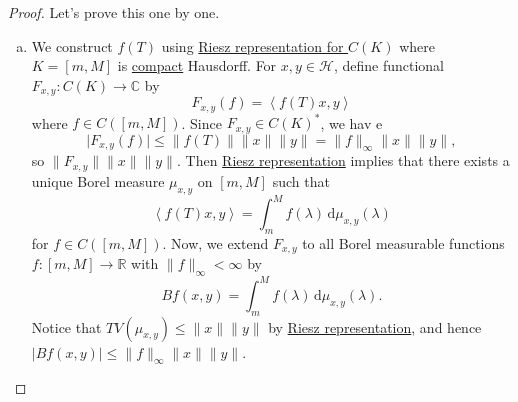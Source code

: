 \begin{proof}
	Let's prove this one by one.
	\begin{enumerate}[(a)]
		\item We construct \(f(T)\)  using \hyperref[thm:Riesz-representation-for-C-K]{Riesz representation for \(C(K)\)} where \(K = [m, M]\) is \hyperref[def:compact]{compact} Hausdorff. For \(x, y\in \mathcal{H} \), define functional \(F_{x, y} \colon C(K) \to \mathbb{C} \) by
		      \[
			      F_{x, y} (f) = \left\langle f(T)x, y \right\rangle
		      \]
		      where \(f\in C([m, M])\). Since \(F_{x, y} \in C(K)^{\ast} \), we hav e
		      \[
			      \vert F_{x, y}(f) \vert
			      \leq \lVert f(T) \rVert  \lVert x \rVert \lVert y \rVert
			      = \lVert f \rVert _{\infty } \lVert x \rVert \lVert y \rVert,
		      \]
		      so \(\lVert F_{x, y} \rVert \lVert x \rVert \lVert y \rVert \). Then \hyperref[thm:Riesz-representation-for-C-K]{Riesz representation} implies that there exists a unique Borel measure \(\mu _{x, y} \) on \([m, M]\) such that
		      \[
			      \left\langle f(T) x, y  \right\rangle
			      = \int_{m}^{M} f(\lambda ) \,\mathrm{d}\mu _{x, y}(\lambda )
		      \]
		      for \(f\in C([m, M])\). Now, we extend \(F_{x, y}\) to all Borel measurable functions \(f\colon [m, M] \to \mathbb{R} \) with \(\lVert f \rVert _\infty < \infty \) by
		      \[
			      Bf(x, y) = \int_{m}^{M} f(\lambda ) \,\mathrm{d}\mu _{x, y} (\lambda ).
		      \]
		      Notice that \(TV(\mu _{x, y}) \leq \lVert x \rVert \lVert y \rVert \) by \hyperref[thm:Riesz-representation-for-C-K]{Riesz representation}, and hence \(\vert Bf(x, y) \vert \leq \lVert f \rVert _\infty \lVert x \rVert \lVert y \rVert \).


\end{enumerate}
\end{proof}
